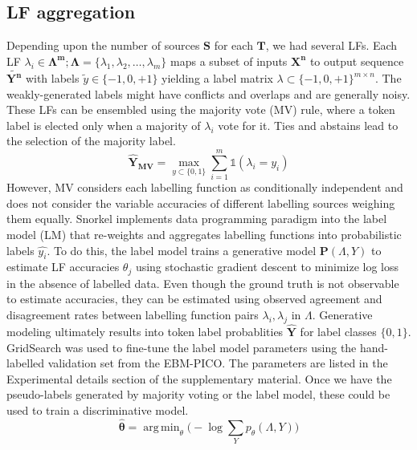 \documentclass[10.7pt,]{article}
\DeclareMathOperator*{\argmin}{arg\,min}
\begin{document}
\subsection{LF aggregation}\label{lms}
%
Depending upon the number of sources $\bm{S}$ for each $\bm{T}$, we had several LFs. 
Each LF $ \lambda_{i} \in \bm{\Lambda^{m}}; \bm{\Lambda} = \{\lambda_{1}, \lambda_{2}, \dotso, \lambda_{m} \} $ maps a subset of inputs $\bm{X^{n}}$ to output sequence $ \widetilde{\bm{Y^{n}}}$ with labels $\widetilde{y} \in \{-1, 0, +1\}$ yielding a label matrix $ \lambda \subset \{-1, 0, +1\}^{m \times n}$.
The weakly-generated labels might have conflicts and overlaps and are generally noisy.
These LFs can be ensembled using the majority vote (MV) rule, where a token label is elected only when a majority of $\lambda_{i}$ vote for it.
Ties and abstains lead to the selection of the majority label.
%
\begin{equation}
\bm{\hat{Y}_{MV}} = \max_{{y \subset \{ 0, 1 \} }} \sum_{i=1}^{m} \mathds{1} (\lambda_{i} = y_{i})
\end{equation}
%
However, MV considers each labelling function as conditionally independent and does not consider the variable accuracies of different labelling sources weighing them equally.
Snorkel implements data programming paradigm into the label model (LM) that re-weights and aggregates labelling functions into probabilistic labels $\hat{y_{i}}$.
To do this, the label model trains a generative model $ \bm{P} ( \Lambda , Y )$ to estimate LF accuracies $\theta_{j}$ using stochastic gradient descent to minimize log loss in the absence of labelled data.\cite{ratner2017snorkel,dunnmon2020cross}
Even though the ground truth is not observable to estimate accuracies, they can be estimated using observed agreement and disagreement rates between labelling function pairs $ \lambda_{i}, \lambda_{j}$ in $\Lambda$.
Generative modeling ultimately results into token label probablities $\bm{\hat{Y}}$ for label classes $ \{ 0, 1\} $.
GridSearch was used to fine-tune the label model parameters using the hand-labelled validation set from the EBM-PICO.
The parameters are listed in the Experimental details section of the supplementary material.
Once we have the pseudo-labels generated by majority voting or the label model, these could be used to train a discriminative model.
%
\begin{equation}
\bm{\hat{\theta}} = \argmin_{\theta} \big( -\log \sum_{Y} p_{\theta} (\Lambda , Y ) \big)
\end{equation}
%
%
%
\end{document}
